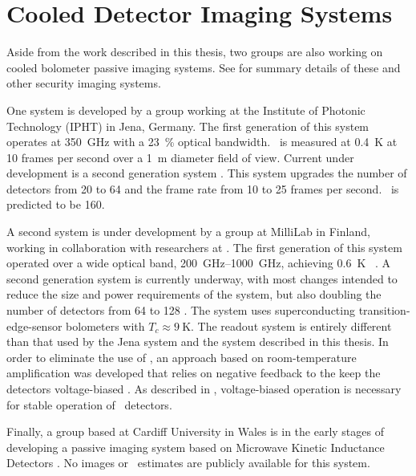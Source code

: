 \section{Cooled Detector Imaging Systems}

Aside from the work described in this thesis, two groups are also working on cooled bolometer passive imaging systems.
See  for summary details of these and other security imaging systems.

One system is developed by a group working at the Institute of Photonic Technology (IPHT) in Jena, Germany.
The first generation of this system \cite{heinz_toward_2011} operates at \SI{350}{\GHz} with a \SI{23}{\percent} optical bandwidth.
\NETD\ is measured at \SI{0.4}{\K} at 10 frames per second over a \SI{1}{\m} diameter field of view.
Current under development is a second generation system \cite{heinz_development_2013,may_next_2013}.
This system upgrades the number of detectors from 20 to 64 and the frame rate from 10 to 25 frames per second.
\NETD\ is predicted to be \SI{160}{\mK}.

A second system is under development by a group at MilliLab in Finland, working in collaboration with researchers at \NIST.
The first generation of this system operated over a wide optical band, \SIrange{200}{1000}{\GHz}, achieving \SI{0.6}{\K} \NETD\ \cite{grossman_passive_2010}.
A second generation system is currently underway, with most changes intended to reduce the size and power requirements of the system, but also doubling the number of detectors from 64 to 128 \cite{luukanen_applications_2012}.
The system uses superconducting transition-edge-sensor bolometers with $T_c \approx \SI{9}{\K}$.
The readout system is entirely different than that used by the Jena system and the system described in this thesis.
In order to eliminate the use of \SQUIDs, an approach based on room-temperature amplification was developed that relies on negative feedback to the keep the detectors voltage-biased \cite{penttila_low-noise_2006}.
As described in , voltage-biased operation is necessary for stable operation of \TES\ detectors.

Finally, a group based at Cardiff University in Wales is in the early stages of developing a passive imaging system \cite{day_broadband_2003} based on Microwave Kinetic Inductance Detectors \cite{wood_kidcam_2011}.
No images or \NETD\ estimates are publicly available for this system.

